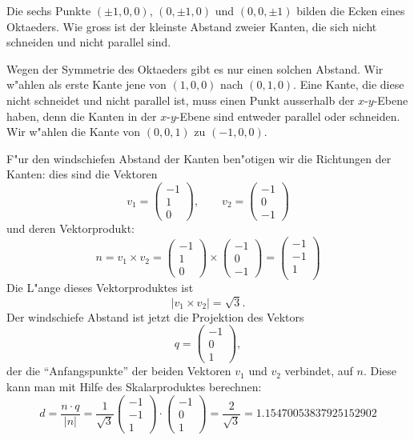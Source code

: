 Die sechs Punkte $(\pm 1,0,0)$, $(0,\pm1,0)$ und $(0,0,\pm1)$ bilden
die Ecken eines Oktaeders.
Wie gross ist der kleinste Abstand zweier Kanten, die sich
nicht schneiden und nicht parallel sind.

\begin{loesung}
Wegen der Symmetrie des Oktaeders gibt es nur einen solchen Abstand.
Wir w"ahlen als erste Kante jene von $(1,0,0)$ nach $(0,1,0)$. Eine
Kante, die diese nicht schneidet und nicht parallel ist, muss einen
Punkt ausserhalb der $x$-$y$-Ebene haben, denn die Kanten in der
$x$-$y$-Ebene sind entweder parallel oder schneiden. Wir w"ahlen die
Kante von $(0,0,1)$ zu $(-1,0,0)$.

F"ur den windschiefen Abstand der Kanten ben"otigen wir die Richtungen
der Kanten: dies sind die Vektoren
\[
v_1=\begin{pmatrix}
-1\\1\\0
\end{pmatrix}
,\qquad
v_2=\begin{pmatrix}
-1\\0\\-1
\end{pmatrix}
\]
und deren Vektorprodukt:
\[
n=v_1\times v_2
=
\begin{pmatrix}
-1\\1\\0
\end{pmatrix}
\times
\begin{pmatrix}
-1\\0\\-1
\end{pmatrix}
=
\begin{pmatrix}
-1\\
-1\\
1\\
\end{pmatrix}
\]
Die L"ange  dieses Vektorproduktes ist
\[
|v_1\times v_2|=\sqrt{3}.
\]
Der windschiefe Abstand ist jetzt die Projektion des Vektors
\[
q=\begin{pmatrix}
-1\\0\\1
\end{pmatrix},
\]
der die ``Anfangspunkte''  der beiden Vektoren $v_1$ und $v_2$
verbindet, auf $n$. Diese kann man mit Hilfe des Skalarproduktes
berechnen:
\[
d=\frac{n\cdot q}{|n|}=
\frac1{\sqrt{3}} \begin{pmatrix}-1\\-1\\1\end{pmatrix}\cdot\begin{pmatrix}
-1\\0\\1
\end{pmatrix}
=\frac2{\sqrt{3}}
=1.15470053837925152902
\]
\end{loesung}


